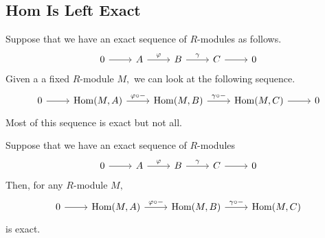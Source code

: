 \subsection{Hom Is Left Exact}
Suppose that we have an exact sequence of $R$-modules as follows.
\[\begin{tikzcd}
	0 & A & B & C & 0
	\arrow[from=1-1, to=1-2]
	\arrow["\varphi", from=1-2, to=1-3]
	\arrow["\gamma", from=1-3, to=1-4]
	\arrow[from=1-4, to=1-5]
\end{tikzcd}\]
Given a a fixed $R$-module $M,$ we can look at the following sequence.
\[\begin{tikzcd}
	0 & {\operatorname{Hom}(M,A)} & {\operatorname{Hom}(M,B)} & {\operatorname{Hom}(M,C)} & 0
	\arrow[from=1-1, to=1-2]
	\arrow["{\varphi\circ-}", from=1-2, to=1-3]
	\arrow["{\gamma\circ-}", from=1-3, to=1-4]
	\arrow[from=1-4, to=1-5]
\end{tikzcd}\]
Most of this sequence is exact but not all.
\begin{proposition} \label{prop:homleft}
	Suppose that we have an exact sequence of $R$-modules
	\[\begin{tikzcd}
		0 & A & B & C & 0
		\arrow[from=1-1, to=1-2]
		\arrow["\varphi", from=1-2, to=1-3]
		\arrow["\gamma", from=1-3, to=1-4]
		\arrow[from=1-4, to=1-5]
	\end{tikzcd}\]
	Then, for any $R$-module $M,$
	\[\begin{tikzcd}
		0 & {\operatorname{Hom}(M,A)} & {\operatorname{Hom}(M,B)} & {\operatorname{Hom}(M,C)}
		\arrow[from=1-1, to=1-2]
		\arrow["{\varphi\circ-}", from=1-2, to=1-3]
		\arrow["{\gamma\circ-}", from=1-3, to=1-4]
	\end{tikzcd}\]
	is exact.
\end{proposition}
